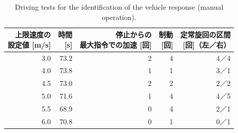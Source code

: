 \begin{table}[!htbp]
  \centering
  \caption[Driving tests for the identification of the vehicle response.]{Driving tests for the identification of the vehicle response (manual operation).}
  \label{tab:ident_runs}
  \small
  \begin{lrbox}{\tblbox}\setlength{\tabcolsep}{5pt}\begin{tabular}{rrrrr}
    \toprule
    \shortstack[r]{上限速度の\\設定値 {[m/s]}} & \shortstack[r]{時間\\{[s]}} & \shortstack[r]{停止からの\\最大指令での加速 {[回]}} & \shortstack[r]{制動\\{[回]}} & \shortstack[r]{定常旋回の区間\\{[回]（左／右）}} \\
    \midrule
    3.0 & 73.2 & 2 & 4 & 4／4 \\
    4.0 & 73.8 & 1 & 1 & 3／1 \\
    4.5 & 73.0 & 2 & 2 & 2／2 \\
    5.0 & 71.6 & 1 & 4 & 4／5 \\
    5.5 & 68.9 & 0 & 4 & 2／1 \\
    6.0 & 70.8 & 0 & 1 & 0／1 \\
    \bottomrule
  \end{tabular}\end{lrbox}\usebox{\tblbox}
\end{table}

